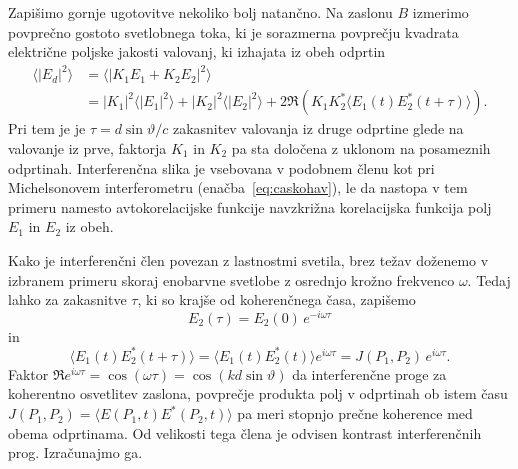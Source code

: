 Zapišimo gornje ugotovitve nekoliko bolj natančno. Na zaslonu $B$
izmerimo povprečno gostoto svetlobnega toka, ki je sorazmerna povprečju kvadrata
električne poljske jakosti valovanj, ki izhajata iz obeh odprtin
\begin{align}
\langle|E{}_{d}|^{2}\rangle & =\langle|K_{1}E_{1}+K_{2}E_{2}|^{2}\rangle\nonumber \\
&=  |K_{1}|^{2}\langle|E_{1}|^{2}\rangle+|K_{2}|^{2}\langle|E_{2}|^{2}\rangle+
2\Re \left( K_{1}K_{2}^{*}\langle E_{1}(t)E_{2}^{*}(t+\tau)\rangle\right).
\end{align}
Pri tem je je $\tau=d\sin\vartheta/c$ zakasnitev valovanja iz druge odprtine
glede na valovanje iz prve, faktorja $K_{1}$ in $K_{2}$ pa sta določena
z uklonom na posameznih odprtinah. Interferenčna slika je vsebovana v podobnem 
členu kot pri Michelsonovem interferometru (enačba~\ref{eq:caskohav}), 
le da nastopa v tem primeru namesto avtokorelacijske funkcije
navzkrižna korelacijska funkcija polj $E_{1}$ in $E_{2}$ iz obeh. 

Kako je interferenčni člen povezan z lastnostmi svetila, brez težav
doženemo v izbranem primeru skoraj enobarvne svetlobe z osrednjo krožno frekvenco
$\omega$. Tedaj lahko za zakasnitve $\tau$, ki so krajše
od koherenčnega časa, zapišemo 
\begin{equation}
E_{2}(\tau)=E_{2}(0)\, e^{-i\omega\tau}
\end{equation}
 in 
\begin{equation}
\langle E_{1}(t)E_{2}^{*}(t+\tau)\rangle=
\langle E_{1}(t)E_{2}^{*}(t)\rangle 
e^{i\omega\tau}=J(P_{1},P_{2})\, e^{i\omega\tau}.
\end{equation}
Faktor $\Re e^{i\omega\tau}= \cos(\omega \tau) = \cos(kd\sin\vartheta)$ da interferenčne
proge za koherentno osvetlitev zaslona, povprečje produkta polj
v odprtinah ob istem času $J(P_{1},P_{2})=\langle E(P_{1},t)E^{*}(P_{2},t)\rangle$
pa meri stopnjo prečne koherence med obema odprtinama. Od velikosti
tega člena je odvisen kontrast interferenčnih prog. Izračunajmo ga.

